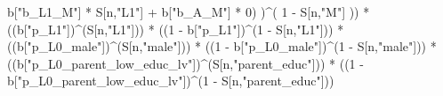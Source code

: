 \documentclass[
]{book}
\newenvironment{Shaded}{\begin{snugshade}}{\end{snugshade}}
\newcommand{\DecValTok}[1]{\textcolor[rgb]{0.00,0.00,0.81}{#1}}
\newcommand{\NormalTok}[1]{#1}
\newcommand{\SpecialCharTok}[1]{\textcolor[rgb]{0.00,0.00,0.00}{#1}}
\newcommand{\StringTok}[1]{\textcolor[rgb]{0.31,0.60,0.02}{#1}}
\begin{document}
\begin{Shaded}
\begin{Highlighting}[]
\NormalTok{                b[}\StringTok{"b\_L1\_M"}\NormalTok{] }\SpecialCharTok{*}\NormalTok{ S[n,}\StringTok{"L1"}\NormalTok{] }\SpecialCharTok{+}
\NormalTok{                b[}\StringTok{"b\_A\_M"}\NormalTok{] }\SpecialCharTok{*} \DecValTok{0}\NormalTok{) )}\SpecialCharTok{\^{}}\NormalTok{( }\DecValTok{1} \SpecialCharTok{{-}}\NormalTok{ S[n,}\StringTok{"M"}\NormalTok{] ))  }\SpecialCharTok{*}
\NormalTok{      ((b[}\StringTok{"p\_L1"}\NormalTok{])}\SpecialCharTok{\^{}}\NormalTok{(S[n,}\StringTok{"L1"}\NormalTok{])) }\SpecialCharTok{*}
\NormalTok{      ((}\DecValTok{1} \SpecialCharTok{{-}}\NormalTok{ b[}\StringTok{"p\_L1"}\NormalTok{])}\SpecialCharTok{\^{}}\NormalTok{(}\DecValTok{1} \SpecialCharTok{{-}}\NormalTok{ S[n,}\StringTok{"L1"}\NormalTok{])) }\SpecialCharTok{*}
\NormalTok{      ((b[}\StringTok{"p\_L0\_male"}\NormalTok{])}\SpecialCharTok{\^{}}\NormalTok{(S[n,}\StringTok{"male"}\NormalTok{])) }\SpecialCharTok{*} 
\NormalTok{      ((}\DecValTok{1} \SpecialCharTok{{-}}\NormalTok{ b[}\StringTok{"p\_L0\_male"}\NormalTok{])}\SpecialCharTok{\^{}}\NormalTok{(}\DecValTok{1} \SpecialCharTok{{-}}\NormalTok{ S[n,}\StringTok{"male"}\NormalTok{])) }\SpecialCharTok{*} 
\NormalTok{      ((b[}\StringTok{"p\_L0\_parent\_low\_educ\_lv"}\NormalTok{])}\SpecialCharTok{\^{}}\NormalTok{(S[n,}\StringTok{"parent\_educ"}\NormalTok{])) }\SpecialCharTok{*}
\NormalTok{      ((}\DecValTok{1} \SpecialCharTok{{-}}\NormalTok{ b[}\StringTok{"p\_L0\_parent\_low\_educ\_lv"}\NormalTok{])}\SpecialCharTok{\^{}}\NormalTok{(}\DecValTok{1} \SpecialCharTok{{-}}\NormalTok{ S[n,}\StringTok{"parent\_educ"}\NormalTok{])) }
    

\end{Highlighting}
\end{Shaded}
\end{document}
